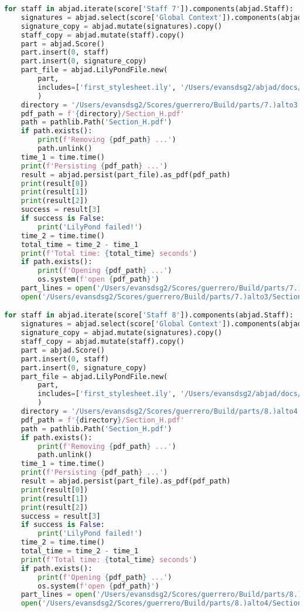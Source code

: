 \begin{lstlisting}[language=Python, caption=Invocation Source Code]
for staff in abjad.iterate(score['Staff 7']).components(abjad.Staff):
    signatures = abjad.select(score['Global Context']).components(abjad.Staff)
    signature_copy = abjad.mutate(signatures).copy()
    staff_copy = abjad.mutate(staff).copy()
    part = abjad.Score()
    part.insert(0, staff)
    part.insert(0, signature_copy)
    part_file = abjad.LilyPondFile.new(
        part,
        includes=['first_stylesheet.ily', '/Users/evansdsg2/abjad/docs/source/_stylesheets/abjad.ily'],
        )
    directory = '/Users/evansdsg2/Scores/guerrero/Build/parts/7.)alto3'
    pdf_path = f'{directory}/Section_H.pdf'
    path = pathlib.Path('Section_H.pdf')
    if path.exists():
        print(f'Removing {pdf_path} ...')
        path.unlink()
    time_1 = time.time()
    print(f'Persisting {pdf_path} ...')
    result = abjad.persist(part_file).as_pdf(pdf_path)
    print(result[0])
    print(result[1])
    print(result[2])
    success = result[3]
    if success is False:
        print('LilyPond failed!')
    time_2 = time.time()
    total_time = time_2 - time_1
    print(f'Total time: {total_time} seconds')
    if path.exists():
        print(f'Opening {pdf_path} ...')
        os.system(f'open {pdf_path}')
    part_lines = open('/Users/evansdsg2/Scores/guerrero/Build/parts/7.)alto3/Section_H.ly').readlines()
    open('/Users/evansdsg2/Scores/guerrero/Build/parts/7.)alto3/Section_H.ly', 'w').writelines(part_lines[15:-1])

for staff in abjad.iterate(score['Staff 8']).components(abjad.Staff):
    signatures = abjad.select(score['Global Context']).components(abjad.Staff)
    signature_copy = abjad.mutate(signatures).copy()
    staff_copy = abjad.mutate(staff).copy()
    part = abjad.Score()
    part.insert(0, staff)
    part.insert(0, signature_copy)
    part_file = abjad.LilyPondFile.new(
        part,
        includes=['first_stylesheet.ily', '/Users/evansdsg2/abjad/docs/source/_stylesheets/abjad.ily'],
        )
    directory = '/Users/evansdsg2/Scores/guerrero/Build/parts/8.)alto4'
    pdf_path = f'{directory}/Section_H.pdf'
    path = pathlib.Path('Section_H.pdf')
    if path.exists():
        print(f'Removing {pdf_path} ...')
        path.unlink()
    time_1 = time.time()
    print(f'Persisting {pdf_path} ...')
    result = abjad.persist(part_file).as_pdf(pdf_path)
    print(result[0])
    print(result[1])
    print(result[2])
    success = result[3]
    if success is False:
        print('LilyPond failed!')
    time_2 = time.time()
    total_time = time_2 - time_1
    print(f'Total time: {total_time} seconds')
    if path.exists():
        print(f'Opening {pdf_path} ...')
        os.system(f'open {pdf_path}')
    part_lines = open('/Users/evansdsg2/Scores/guerrero/Build/parts/8.)alto4/Section_H.ly').readlines()
    open('/Users/evansdsg2/Scores/guerrero/Build/parts/8.)alto4/Section_H.ly', 'w').writelines(part_lines[15:-1])


\end{lstlisting}
